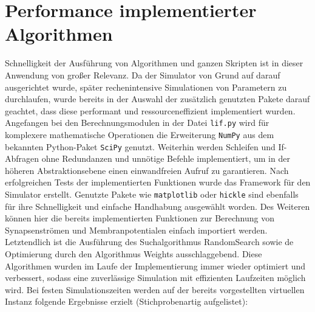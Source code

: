 \section{Performance implementierter Algorithmen}
\label{sec:erg_performance}
	Schnelligkeit der Ausführung von Algorithmen und ganzen Skripten ist in dieser Anwendung von großer Relevanz. Da der Simulator von Grund auf darauf ausgerichtet wurde, später rechenintensive Simulationen von Parametern zu durchlaufen, wurde bereits in der Auswahl der zusätzlich genutzten Pakete darauf geachtet, dass diese performant und ressourceneffizient implementiert wurden.\\
	Angefangen bei den Berechnungsmodulen in der Datei \texttt{lif.py} wird für komplexere mathematische Operationen die Erweiterung \texttt{NumPy} \cite{NumPy} aus dem bekannten Python-Paket \texttt{SciPy} \cite{NumPy} genutzt. Weiterhin werden Schleifen und If-Abfragen ohne Redundanzen und unnötige Befehle implementiert, um in der höheren Abstraktionsebene einen einwandfreien Aufruf zu garantieren. Nach erfolgreichen Tests der implementierten Funktionen wurde das Framework für den Simulator erstellt. Genutzte Pakete wie \texttt{matplotlib} \cite{Hunter2007} oder \texttt{hickle} \cite{hdf5} sind ebenfalls für ihre Schnelligkeit und einfache Handhabung ausgewählt worden. Des Weiteren können hier die bereits implementierten Funktionen zur Berechnung von Synapsenströmen und Membranpotentialen einfach importiert werden.\\
	Letztendlich ist die Ausführung des Suchalgorithmus RandomSearch sowie de Optimierung durch den Algorithmus Weights ausschlaggebend. Diese Algorithmen wurden im Laufe der Implementierung immer wieder optimiert und verbessert, sodass eine zuverlässige Simulation mit effizienten Laufzeiten möglich wird. Bei festen Simulationszeiten werden auf der bereits vorgestellten virtuellen Instanz folgende Ergebnisse erzielt (Stichprobenartig aufgelistet):
	\begin{table}[H]
		\centering
	\caption{Parametersuche durch Algorithmus \texttt{RandomSearch}.}
	\label{tab:sim_rs}
	\end{table}
